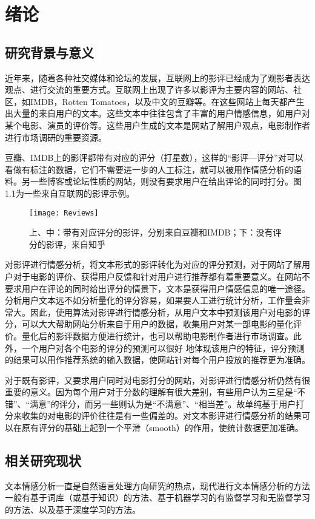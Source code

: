 \chapter{绪论}

\section{研究背景与意义}
近年来，随着各种社交媒体和论坛的发展，互联网上的影评已经成为了观影者表达观点、进行交流的重要方式。互联网上出现了许多以影评为主要内容的网站、社区，如IMDB，Rotten Tomatoes，以及中文的豆瓣等。在这些网站上每天都产生出大量的来自用户的文本。这些文本中往往包含了丰富的用户情感信息，如用户对某个电影、演员的评价等。这些用户生成的文本是网站了解用户观点，电影制作者进行市场调研的重要资源。

豆瓣、IMDB上的影评都带有对应的评分（打星数），这样的“影评—评分”对可以看做有标注的数据，它们不需要进一步的人工标注，就可以被用作情感分析的语料。另一些博客或论坛性质的网站，则没有要求用户在给出评论的同时打分。图1.1为一些来自互联网的影评示例。
\begin{figure}[ht]
\centering
\texttt{[image: Reviews]}
\caption{上、中：带有对应评分的影评，分别来自豆瓣和IMDB；下：没有评分的影评，来自知乎} \label{fig:Reviews}
\end{figure}

对影评进行情感分析，将文本形式的影评转化为对应的评分预测，对于网站了解用户对于电影的评价、获得用户反馈和针对用户进行推荐都有着重要意义。在网站不要求用户在评论的同时给出评分的情景下，文本是获得用户情感信息的唯一途径。分析用户文本远不如分析量化的评分容易，如果要人工进行统计分析，工作量会非常大。因此，使用算法对影评进行情感分析，从用户文本中预测该用户对电影的评分，可以大大帮助网站分析来自于用户的数据，收集用户对某一部电影的量化评价。量化后的影评数据方便进行统计，也可以帮助电影制作者进行市场调查。此外，一个用户对各个电影的评分的预测可以很好 地体现该用户的特征，评分预测的结果可以用作推荐系统的输入数据，使网站针对每个用户投放的推荐更为准确。

对于既有影评，又要求用户同时对电影打分的网站，对影评进行情感分析仍然有很重要的意义。因为每个用户对于分数的理解有很大差别，有些用户认为三星是“不错”、“满意”的评分，而另一些则认为是“不满意”、“相当差”。故单纯基于用户打分来收集的对电影的评价往往是有一些偏差的。对文本影评进行情感分析的结果可以在原有评分的基础上起到一个平滑（smooth）的作用，使统计数据更加准确。



\section{相关研究现状}
文本情感分析一直是自然语言处理方向研究的热点，现代进行文本情感分析的方法一般有基于词库（或基于知识）的方法、基于机器学习的有监督学习和无监督学习的方法、以及基于深度学习的方法。

